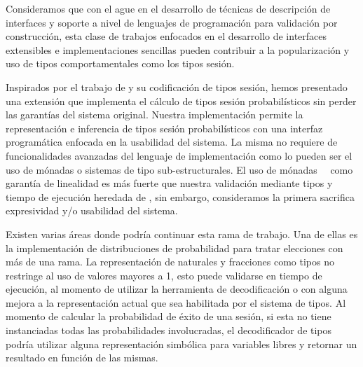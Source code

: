 Consideramos que con el ague en el desarrollo de técnicas de descripción de
interfaces y soporte a nivel de lenguajes de programación para validación por
construcción, esta clase de trabajos enfocados en el desarrollo de interfaces
extensibles e implementaciones sencillas pueden contribuir a la popularización
y uso de tipos comportamentales como los tipos sesión.

Inspirados por el trabajo de \FuSe y su codificación de tipos sesión, hemos
presentado una extensión que implementa el cálculo de tipos sesión
probabilísticos sin perder las garantías del sistema original. Nuestra
implementación permite la representación e inferencia de tipos sesión
probabilísticos con una interfaz programática enfocada en la usabilidad del
sistema. La misma no requiere de funcionalidades avanzadas del lenguaje de
implementación como lo pueden ser el uso de mónadas o sistemas de tipo
sub-estructurales. El uso de mónadas~\cite{fmt18}~\cite{pucella08} como
garantía de linealidad es más fuerte que nuestra validación mediante tipos y
tiempo de ejecución heredada de \FuSe, sin embargo, consideramos la primera
sacrifica expresividad y/o usabilidad del sistema.

Existen varias áreas donde podría continuar esta rama de trabajo. Una de ellas
es la implementación de distribuciones de probabilidad para tratar elecciones
con más de una rama. La representación de naturales y fracciones como tipos no
restringe al uso de valores mayores a 1, esto puede validarse en tiempo de
ejecución, al momento de utilizar la herramienta de decodificación o con alguna
mejora a la representación actual que sea habilitada por el sistema de tipos.
Al momento de calcular la probabilidad de éxito de una sesión, si esta no tiene
instanciadas todas las probabilidades involucradas, el decodificador de tipos
podría utilizar alguna representación simbólica para variables libres y
retornar un resultado en función de las mismas.
